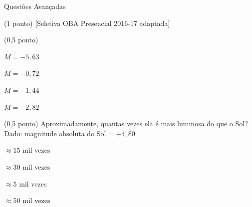 \documentclass{../lista}
\begin{document}
\begin{secao}{Questões Avançadas}
\begin{questao}{(1 ponto) [Seletiva OBA Presencial 2016-17 adaptada]}
\begin{pergunta}{(0,5 ponto)}
				\begin{alternativas}
					\item $M = -5,63$
					\item $M = -0,72$
					\item $M = -1,44$
					\item $M = -2,82$
				\end{alternativas}
			\end{pergunta}
			
			\begin{pergunta}{(0,5 ponto)}
				Aproximadamente, quantas vezes ela é mais luminosa do que o Sol? \\
				Dado: magnitude absoluta do Sol = $+4,80$
				
				\begin{alternativas}
					\item $\approx 15$ mil vezes
					\item $\approx 30$ mil vezes
					\item $\approx 5$ mil vezes
					\item $\approx 50$ mil vezes
				\end{alternativas}
			\end{pergunta}
		\end{questao}
	\end{secao}
\end{document}
